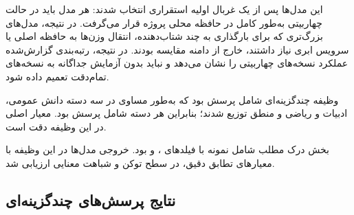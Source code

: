 این مدل‌ها پس از یک غربال اولیه استقراری انتخاب شدند: هر مدل باید
در حالت چهاربیتی  به‌طور کامل در حافظه  محلی پروژه
قرار می‌گرفت. در نتیجه، مدل‌های بزرگ‌تری که برای بارگذاری به چند
شتاب‌دهنده، انتقال وزن‌ها به حافظه اصلی یا سرویس ابری نیاز داشتند،
خارج از دامنه مقایسه بودند.
در نتیجه، رتبه‌بندی گزارش‌شده عملکرد نسخه‌های چهاربیتی را نشان
می‌دهد و نباید بدون آزمایش جداگانه به نسخه‌های تمام‌دقت تعمیم داده شود.

وظیفه چندگزینه‌ای شامل  پرسش بود که به‌طور مساوی در سه
دسته دانش عمومی، ادبیات و ریاضی و منطق توزیع شدند؛ بنابراین هر
دسته شامل  پرسش بود. معیار اصلی در این وظیفه دقت است.

بخش درک مطلب  شامل  نمونه با فیلدهای
،  و  بود. خروجی مدل‌ها در این
وظیفه با معیارهای تطابق دقیق،  در سطح توکن و شباهت معنایی
ارزیابی شد.


\subsection{نتایج پرسش‌های چندگزینه‌ای}

\begin{table}[H]
\centering
\caption{دقت مدل‌های زبانی در وظیفه چندگزینه‌ای }
\label{tab:llm_mcq_results}

\end{table}

